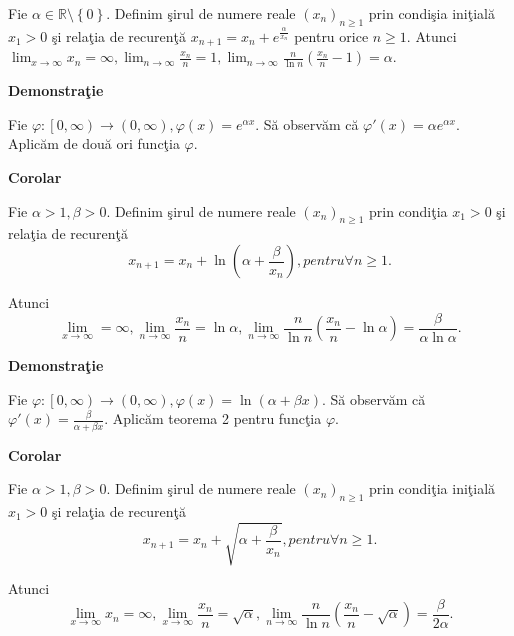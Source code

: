 \documentclass[a4paper,12pt,oneside]{report}
\begin{document}
Fie \(\alpha \in \mathbb{R} \setminus \left \{ 0 \right \}\). Definim \c sirul de numere reale \(\left ( x_{n} \right )_{n\geq 1}\) prin condi\c sia ini\c tial\u a \(x_{1}> 0\) \c si rela\c tia de recuren\c t\u a \(x_{n+1}= x_{n}+ e^{\frac{\alpha }{x_{n}}}\) pentru orice \(n\geq 1\). 
Atunci \(\lim_{x \to \infty }x_{n} = \infty , \lim_{n \to \infty }\frac{x_{n}}{n} = 1, \lim_{n \to \infty }\frac{n}{\ln n }\left ( \frac{x_{n}}{n} -1\right ) = \alpha\). 

\textbf{Demonstra\c tie} 

Fie \(\varphi :\left [ 0,\infty  \right ) \to \left ( 0,\infty \right ), \varphi \left ( x \right ) = e^{\alpha x}\). S\u a observ\u am c\u a \({\varphi }'\left ( x \right ) = \alpha e^{\alpha x}\). Aplic\u am de dou\u a ori func\c tia \(\varphi\). 

\textbf{Corolar} 

Fie \(\alpha > 1,\beta > 0\). Definim \c sirul de numere reale \(\left ( x_{n} \right )_{n\geq 1}\) prin condi\c tia \(x_{1} > 0\) \c si rela\c tia de recuren\c t\u a 
\begin{displaymath}
  x_{n+1} = x_{n} + \ln\left ( \alpha +\frac{\beta }{x_{n}} \right ), pentru \forall n\geq 1.
\end{displaymath}


Atunci 
\begin{displaymath}
  \lim_{x \to \infty }=\infty ,\lim_{n \to \infty }\frac{x_{n}}{n} = \ln \alpha , \lim_{n \to \infty }\frac{n}{\ln n}\left ( \frac{x_{n}}{n} - \ln \alpha \right ) = \frac{\beta }{\alpha \ln \alpha }.
\end{displaymath}
 
\textbf{Demonstra\c tie} 

Fie \(\varphi :\left [ 0,\infty  \right ) \to \left ( 0,\infty  \right ), \varphi \left ( x \right ) = \ln \left ( \alpha   + \beta x \right )\). S\u a observ\u am c\u a \({\varphi }'\left ( x \right ) = \frac{\beta }{\alpha +\beta x}\). Aplic\u am teorema 2 pentru func\c tia \(\varphi\).

\textbf{Corolar} 

Fie \(\alpha > 1,\beta > 0\). Definim \c sirul de numere reale \(\left ( x_{n} \right )_{n\geq 1}\) prin condi\c tia ini\c tial\u a \(x_{1}> 0\) \c si rela\c tia de recuren\c t\u a
\begin{displaymath}
  x_{n+1} = x_{n} + \sqrt{\alpha +\frac{\beta }{x_{n}}}, pentru \forall n\geq 1.
\end{displaymath}


Atunci 
\begin{displaymath}
  \lim_{x \to \infty }x_{n} = \infty , \lim_{x \to \infty }\frac{x_{n}}{n} = \sqrt{\alpha }, \lim_{n \to \infty }\frac{n}{\ln n}\left ( \frac{x_{n}}{n} -\sqrt{\alpha }\right ) = \frac{\beta }{2\alpha }. 
\end{displaymath}
\end{document}
